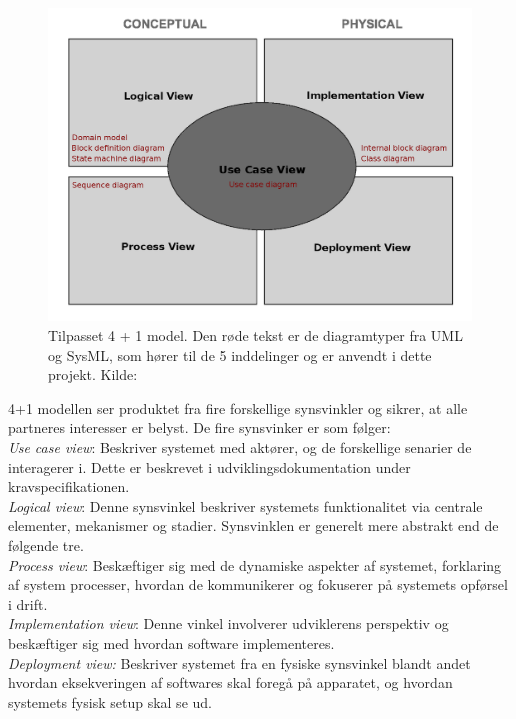 	\begin{figure}[H]
		\includegraphics[width = \textwidth]{billeder/4plus1model.png}
		\caption{Tilpasset 4 + 1 model. Den røde tekst er de diagramtyper fra UML og SysML, som hører til de 5 inddelinger og er anvendt i dette projekt. Kilde: \cite{RefWorks:10}}\label{fig:4plus1model}
	\end{figure}
	
	4+1 modellen ser produktet fra fire forskellige synsvinkler og sikrer, at alle partneres interesser er belyst. De fire synsvinker er som følger: 
	\\ \textit{Use case view}: Beskriver systemet med aktører, og de forskellige senarier de interagerer i. Dette er beskrevet i udviklingsdokumentation under kravspecifikationen.\\
	\textit{Logical view}: Denne synsvinkel beskriver systemets funktionalitet via centrale elementer, mekanismer og stadier. Synsvinklen er generelt mere abstrakt end de følgende tre. \\
	\textit{Process view}: Beskæftiger sig med de dynamiske aspekter af systemet, forklaring af system processer, hvordan de kommunikerer og fokuserer på systemets opførsel i drift. \\
	\textit{Implementation view}: Denne vinkel involverer udviklerens perspektiv og beskæftiger sig med hvordan software implementeres. \\
	\textit{Deployment view:} Beskriver systemet fra en fysiske synsvinkel blandt andet hvordan eksekveringen af softwares skal foregå på apparatet, og hvordan systemets fysisk setup skal se ud. 
	
